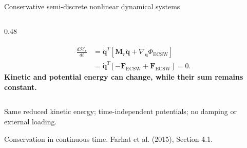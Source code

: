 \documentclass[aspectratio=169]{beamer}
\newcommand{\vect}[1]{\boldsymbol{#1}}
\newcommand{\matr}[1]{\boldsymbol{#1}}
\begin{document}
\begin{frame}{Conservative semi-discrete nonlinear dynamical systems}
\begin{columns}[T,onlytextwidth]
\begin{column}{0.48\textwidth}
\begin{uncoverenv}
\[
\begin{aligned}
  \frac{d\widetilde{\mathcal H}_r}{dt}
  &=\dot{\vect{q}}^T[\matr{M}_r\ddot{\vect{q}}
        +\nabla_{\vect{q}}\Phi_{\mathrm{ECSW}}]\\[1pt]
  &=\dot{\vect{q}}^T[-\vect{F}_{\mathrm{ECSW}}
        +\vect{F}_{\mathrm{ECSW}}]=0.
\end{aligned}
\]
\textbf{Kinetic and potential energy can change, while their sum remains constant.}
\end{uncoverenv}
\end{column}
\end{columns}
\vspace{2pt}
{\fontsize{8}{9}\selectfont
Same reduced kinetic energy; time-independent potentials; no damping or external loading.\par
Conservation in continuous time. Farhat et al. (2015), Section 4.1.
\hfill{}}
\end{frame}
\end{document}
